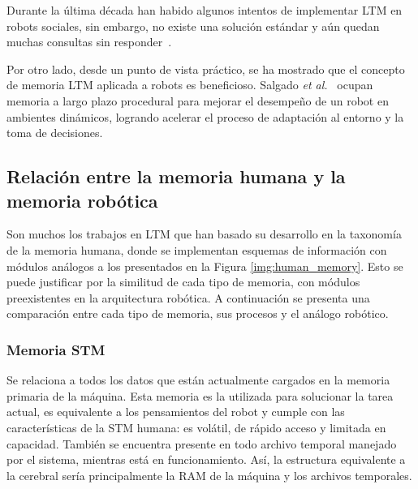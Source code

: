 Durante la última década han habido algunos intentos de implementar LTM en robots sociales, sin embargo, no existe una solución estándar y aún quedan muchas consultas sin responder~\cite{ltm_in_robocup}.

Por otro lado, desde un punto de vista práctico, se ha mostrado que el concepto de memoria LTM aplicada a robots es beneficioso. Salgado \textit{et al.}~\cite{Salgado2012} ocupan memoria a largo plazo procedural para mejorar el desempeño de un robot en ambientes dinámicos, logrando acelerar el proceso de adaptación al entorno y la toma de decisiones.


\subsection{Relación entre la memoria humana y la memoria robótica}


Son muchos los trabajos en LTM que han basado su desarrollo en la taxonomía de la memoria humana, donde se implementan esquemas de información con módulos análogos a los presentados en la Figura \ref{img:human_memory}. Esto se puede justificar por la similitud de cada tipo de memoria, con módulos preexistentes en la arquitectura robótica. A continuación se presenta una comparación entre cada tipo de memoria, sus procesos y el análogo robótico.

\subsubsection{Memoria STM}
Se relaciona a todos los datos que están actualmente cargados en la memoria primaria de la máquina. Esta memoria es la utilizada para solucionar la tarea actual, es equivalente a los pensamientos del robot y cumple con las características de la STM humana: es volátil, de rápido acceso y limitada en capacidad. También se encuentra presente en todo archivo temporal manejado por el sistema, mientras está en funcionamiento. Así, la estructura equivalente a la cerebral sería principalmente la RAM de la máquina y los archivos temporales.

